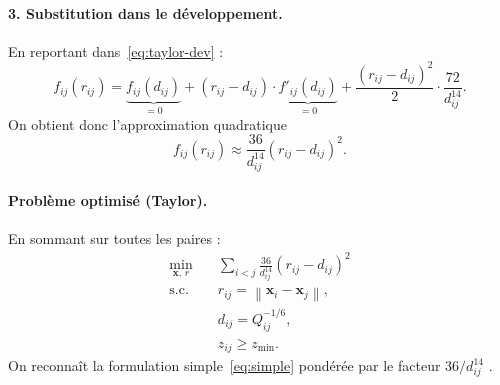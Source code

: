 \documentclass[11pt,a4paper]{article}
\theoremstyle{definition}
\theoremstyle{remark}
\newcommand{\norm}[1]{\left\|#1\right\|}
\begin{document}
\paragraph{3. Substitution dans le développement.}
En reportant dans~\eqref{eq:taylor-dev} :
\begin{equation}
  f_{ij}(r_{ij})
  =
  \underbrace{f_{ij}(d_{ij})}_{=0}
  +
  (r_{ij}-d_{ij})\cdot
  \underbrace{f'_{ij}(d_{ij})}_{=0}
  +
  \frac{(r_{ij}-d_{ij})^2}{2}
  \cdot
  \frac{72}{d_{ij}^{14}}.
\end{equation}
On obtient donc l'approximation quadratique
\begin{equation}
  f_{ij}(r_{ij})
  \approx
  \frac{36}{d_{ij}^{14}}
  (r_{ij}-d_{ij})^2.
  \label{eq:taylor-approx}
\end{equation}

\paragraph{Problème optimisé (Taylor).}
En sommant sur toutes les paires :
\begin{equation}
  \boxed{
  \begin{aligned}
    \min_{\mathbf{x},\,r}
    &\quad
    \sum_{i<j}
    \frac{36}{d_{ij}^{14}}
    (r_{ij}-d_{ij})^2
    \\
    \text{s.c.}
    &\quad
    r_{ij}
    =
    \norm{\mathbf{x}_i-\mathbf{x}_j},
    \\
    &\quad
    d_{ij}
    =
    Q_{ij}^{-1/6},
    \\
    &\quad
    z_{ij}
    \geq
    z_{\min}.
  \end{aligned}
  }
  \label{eq:taylor}
\end{equation}
On reconnaît la formulation simple~\eqref{eq:simple} pondérée par le
facteur $36/d_{ij}^{14}$ .
\end{document}
